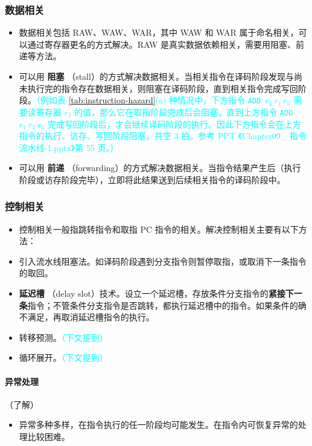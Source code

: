 \documentclass[UTF8]{ctexart}
\newcommand\Rare[1]{\colorbox{cyan!30}{\textcolor{cyan!40!black}{\bfseries #1}} \index{#1} }
\begin{document}
\subsubsection{数据相关}
\begin{itemize}
    \item 数据相关包括 RAW、WAW、WAR，其中 WAW 和 WAR 属于命名相关，可以通过寄存器更名的方式解决。RAW 是真实数据依赖相关，需要用阻塞、前递等方法。
    \item 可以用 \Rare{阻塞} （stall）的方式解决数据相关。当相关指令在译码阶段发现与尚未执行完的指令存在数据相关，则阻塞在译码阶段，直到相关指令完成写回阶段。\textcolor{cyan}{\small （例如表 \ref{tab:instruction-hazard}(a) 种情况中，下方指令 \texttt{ADD}\ $r_4\ r_1\ r_5$ 需要读寄存器 $r_1$ 的值，那么它在取指阶段完成后会阻塞，直到上方指令 \texttt{ADD}\  $r_1\ r_2\ r_3$ 完成写回阶段后，才会继续译码阶段的执行。因此下方指令会在上方指令的执行、访存、写回阶段阻塞，共空 3 拍。参考 PPT 《Chapter09\_ 指令流水线-1.pptx》第 55 页。）}
    \item 可以用 \Rare{前递} （forwarding）的方式解决数据相关。当指令结果产生后（执行阶段或访存阶段完毕），立即将此结果送到后续相关指令的译码阶段中。
\end{itemize}

\subsubsection{控制相关}
\begin{itemize}
    \item 控制相关一般指跳转指令和取指 PC 指令的相关。解决控制相关主要有以下方法：
    \item 引入流水线阻塞法。如译码阶段遇到分支指令则暂停取指，或取消下一条指令的取回。
    \item \Rare{延迟槽}（delay slot）技术。设立一个延迟槽，存放条件分支指令的\textbf{紧接下一条}指令；不管条件分支指令是否跳转，都执行延迟槽中的指令。如果条件的确不满足，再取消延迟槽指令的执行。
    \item 转移预测。\textcolor{cyan}{（下文提到）}
    \item 循环展开。\textcolor{cyan}{（下文提到）}
\end{itemize}

\paragraph{异常处理}（了解）
\begin{itemize}
    \item 异常多种多样，在指令执行的任一阶段均可能发生。在指令内可恢复异常的处理比较困难。
\end{itemize}
\end{document}
